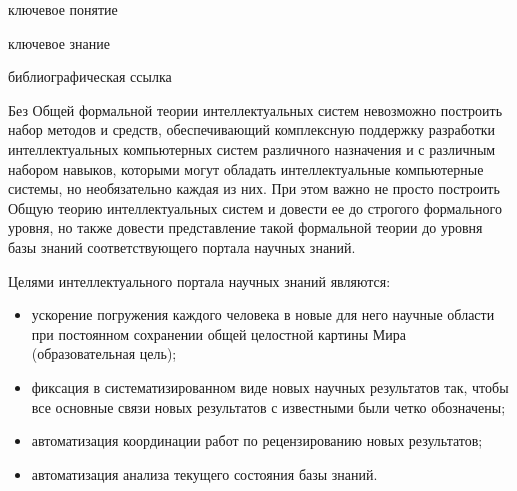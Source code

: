 \begin{SCn}

\bigskip

\begin{scnrelfromlist}{ключевое понятие}
\end{scnrelfromlist}

\bigskip

\begin{scnrelfromlist}{ключевое знание}
\end{scnrelfromlist}

\bigskip

\begin{scnrelfromlist}{библиографическая ссылка}
\end{scnrelfromlist}

\end{SCn}


Без Общей формальной теории интеллектуальных систем невозможно построить набор методов и средств, обеспечивающий комплексную поддержку разработки интеллектуальных компьютерных систем различного назначения и с различным набором навыков, которыми могут обладать интеллектуальные компьютерные системы, но необязательно каждая из них. 
При этом важно не просто построить Общую теорию интеллектуальных систем и довести ее до строгого формального уровня, но также довести представление такой формальной теории до уровня базы знаний соответствующего портала научных знаний.

Целями интеллектуального портала научных знаний являются:
\begin{itemize}
    \item ускорение погружения каждого человека в новые для него научные области при постоянном сохранении общей целостной картины Мира (образовательная цель);
    \item фиксация в систематизированном виде новых научных результатов так, чтобы все основные связи новых результатов с известными были четко обозначены;
    \item автоматизация координации работ по рецензированию новых результатов;
    \item автоматизация анализа текущего состояния базы знаний.
\end{itemize}

